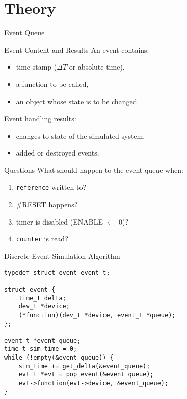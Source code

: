 \section{Theory}

\begin{frame}{Event Queue}
  \centering
\end{frame}

\begin{frame}{Event Content and Results}
An event contains:
\begin{itemize}
\item time stamp ($\Delta T$ or absolute time),
\item a function to be called,
\item an object whose state is to be changed.
\end{itemize}

Event handling results:
\begin{itemize}
\item changes to state of the simulated system,
\item added or destroyed events.
\end{itemize}
\end{frame}

\begin{frame}{Questions}
What should happen to the event queue when:
\begin{enumerate}
  \item \texttt{reference} written to?\pause
  \item \#RESET happens?\pause
  \item timer is disabled (ENABLE $\leftarrow$ 0)?\pause
  \item \texttt{counter} is read?
\end{enumerate}
\end{frame}

\begin{frame}[fragile]{Discrete Event Simulation Algorithm}
\begin{lstlisting}
typedef struct event event_t;

struct event {
    time_t delta;
    dev_t *device;
    (*function)(dev_t *device, event_t *queue);
};

event_t *event_queue;
time_t sim_time = 0;
while (!empty(&event_queue)) {
    sim_time += get_delta(&event_queue);
    evt_t *evt = pop_event(&event_queue);
    evt->function(evt->device, &event_queue);
}
\end{lstlisting}
\end{frame}

